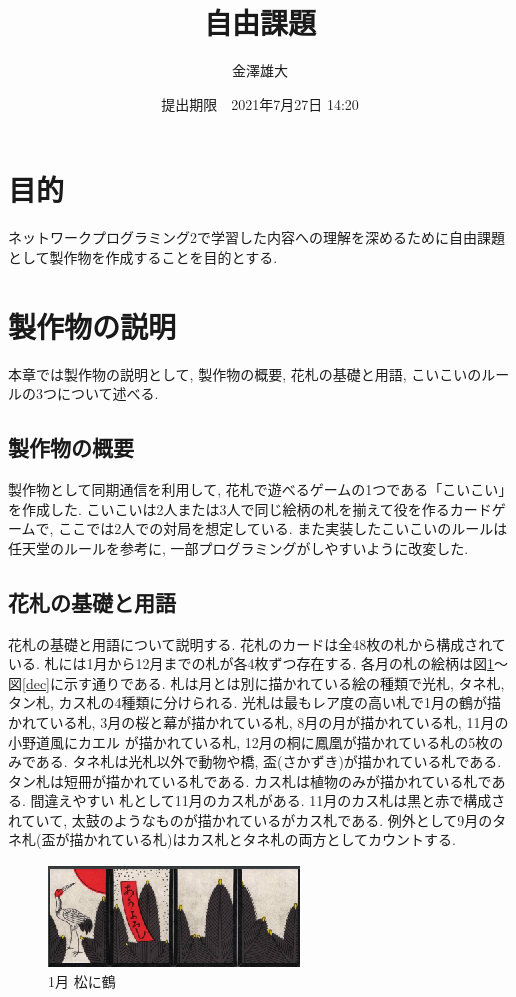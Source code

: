 \documentclass[a4j]{jarticle}
\title{自由課題}
\date{提出期限　2021年7月27日 14:20}
\author{金澤雄大}
\begin{document}
    \maketitle
    \thispagestyle{empty}
    \clearpage
    \addtocounter{page}{-1}
    \section{目的}
    ネットワークプログラミング2で学習した内容への理解を深めるために自由課題として製作物を作成することを目的とする.

    \section{製作物の説明}
    本章では製作物の説明として, 製作物の概要, 花札の基礎と用語, こいこいのルールの3つについて述べる.
    \subsection{製作物の概要}
    製作物として同期通信を利用して, 花札で遊べるゲームの1つである「こいこい」を作成した. こいこいは2人または3人で同じ絵柄の札を揃えて役を作るカードゲームで, ここでは2人での対局を想定している.
    また実装したこいこいのルールは任天堂のルール\cite{nintendo}を参考に, 一部プログラミングがしやすいように改変した.

    \subsection{花札の基礎と用語}
    花札の基礎と用語について説明する. 花札のカードは全48枚の札から構成されている. 札には1月から12月までの札が各4枚ずつ存在する. 各月の札の絵柄は図\ref{jan}～図\ref{dec}に示す通りである.
    札は月とは別に描かれている絵の種類で光札, タネ札, タン札, カス札の4種類に分けられる. 光札は最もレア度の高い札で1月の鶴が描かれている札, 3月の桜と幕が描かれている札, 8月の月が描かれている札, 11月の小野道風にカエル
    が描かれている札, 12月の桐に鳳凰が描かれている札の5枚のみである. タネ札は光札以外で動物や橋, 盃(さかずき)が描かれている札である. タン札は短冊が描かれている札である. カス札は植物のみが描かれている札である. 間違えやすい
    札として11月のカス札がある. 11月のカス札は黒と赤で構成されていて, 太鼓のようなものが描かれているがカス札である. 例外として9月のタネ札(盃が描かれている札)はカス札とタネ札の両方としてカウントする.
    
    \begin{figure}[H]
    \centering
    \includegraphics[scale=1.5]{./img/jan.eps}
    \caption{1月 松に鶴}
    \label{jan}
    \end{figure}
\end{document}
